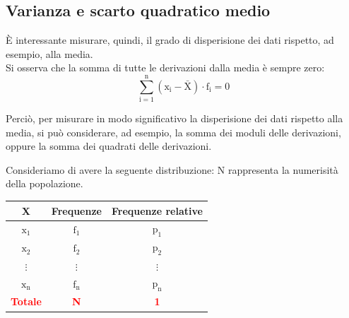 \subsection{Varianza e scarto quadratico medio}
È interessante misurare, quindi, il grado di disperisione dei dati rispetto, ad esempio, alla media.\\[0.2ex]
Si osserva che la somma di tutte le derivazioni dalla media è sempre zero:
\begin{equation*}
\mathrm{\sum_{i=1}^{n}(x_i - \bar{X}) \cdot f_i = 0}
\end{equation*} 

Perciò, per misurare in modo significativo la disperisione dei dati rispetto alla media, si può considerare, ad esempio, la somma dei moduli delle derivazioni, oppure la somma dei quadrati delle derivazioni.

\medskip
Consideriamo di avere la seguente distribuzione: N rappresenta la numerisità della popolazione.

\begin{center}
\begin{tabular}{|c|c|c|}
    \hline
    \textbf{X} & \textbf{Frequenze} & \textbf{Frequenze relative}\\
    \hline
    $\mathrm{x_1}$ & $\mathrm{f_1}$ & $\mathrm{p_1}$\\
    $\mathrm{x_2}$ & $\mathrm{f_2}$ & $\mathrm{p_2}$\\
    $\vdots$ & $\vdots$ & $\vdots$\\
    $\mathrm{x_n}$ & $\mathrm{f_n}$ & $\mathrm{p_n}$\\
    \hline
    \textcolor{red}{\textbf{Totale}} & \textcolor{red}{\textbf{N}} & \textcolor{red}{\textbf{1}}\\
    \hline
\end{tabular}
\end{center}




